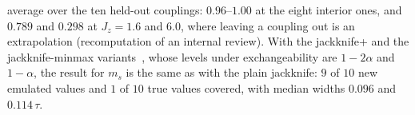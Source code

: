 \documentclass[aps,prx,onecolumn,10pt,nofootinbib,longbibliography,floatfix]{revtex4-2}
\theoremstyle{remark}
\newcommand{\Jz}{J_z}
\newcommand{\ms}{m_s}
\begin{document}
average over the ten held-out couplings: $0.96$--$1.00$ at the eight interior ones, and $0.789$ and $0.298$ at %
$\Jz=1.6$ and $6.0$, where leaving a coupling out is an extrapolation (recomputation of an internal review). With the %
jackknife+ and the jackknife-minmax variants~\cite{barber2019}, whose levels under exchangeability are $1-2\alpha$
and $1-\alpha$, the result for $\ms$ is the same as with the plain jackknife: $9$ of $10$ new emulated values and %
$1$ of $10$ true values covered, with median widths $0.096$ and $0.114\,\tau$. %
\end{document}
